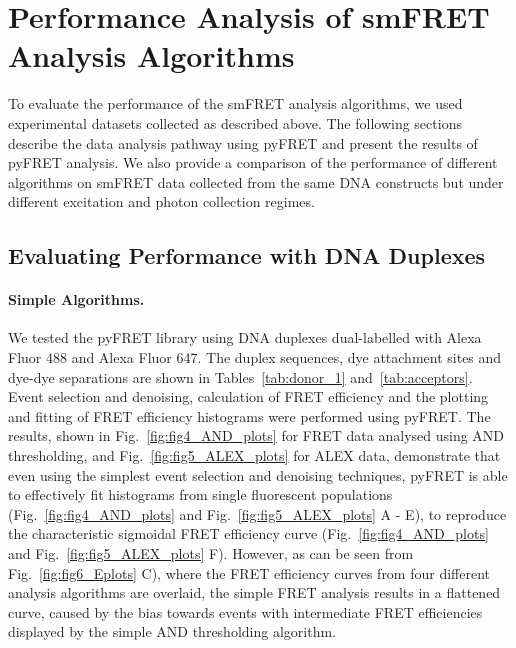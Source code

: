 \section{Performance Analysis of smFRET Analysis Algorithms}
To evaluate the performance of the smFRET analysis algorithms, we used experimental datasets collected as described above. The following sections describe the data analysis pathway using pyFRET and present the results of pyFRET analysis. We also provide a comparison of the performance of different algorithms on smFRET data collected from the same DNA constructs but under different excitation and photon collection regimes.

\subsection{Evaluating Performance with DNA Duplexes}
\paragraph{Simple Algorithms.}
We tested the pyFRET library using DNA duplexes dual-labelled with Alexa Fluor 488 and Alexa Fluor 647. The duplex sequences, dye attachment sites and dye-dye separations are shown in Tables~\ref{tab:donor_1} and~\ref{tab:acceptors}. Event selection and denoising, calculation of FRET efficiency and the plotting and fitting of FRET efficiency histograms were performed using pyFRET. The results, shown in Fig.~\ref{fig:fig4_AND_plots} for FRET data analysed using AND thresholding, and Fig.~\ref{fig:fig5_ALEX_plots} for ALEX data, demonstrate that even using the simplest event selection and denoising techniques, pyFRET is able to effectively fit histograms from single fluorescent populations (Fig.~\ref{fig:fig4_AND_plots} and Fig.~\ref{fig:fig5_ALEX_plots} A - E), to reproduce the characteristic sigmoidal FRET efficiency curve (Fig.~\ref{fig:fig4_AND_plots} and Fig.~\ref{fig:fig5_ALEX_plots} F). However, as can be seen from Fig.~\ref{fig:fig6_Eplots} C), where the FRET efficiency curves from four different analysis algorithms are overlaid, the simple FRET analysis results in a flattened curve, caused by the bias towards events with intermediate FRET efficiencies displayed by the simple AND thresholding algorithm. 

